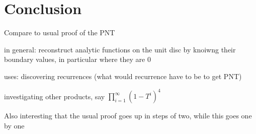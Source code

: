 \documentclass{amsart}
\begin{document}
\section{Conclusion}
Compare to usual proof of the PNT

in general: reconstruct analytic functions on the unit disc by knoiwng
their boundary values, in particular where they are 0

uses: discovering recurrences (what would recurrence have to be to get PNT)

investigating other products, say $\prod_{i=1}^\infty (1-T^i)^4$

Also interesting that the usual proof goes up in steps of two, while this goes one by one



\end{document}
